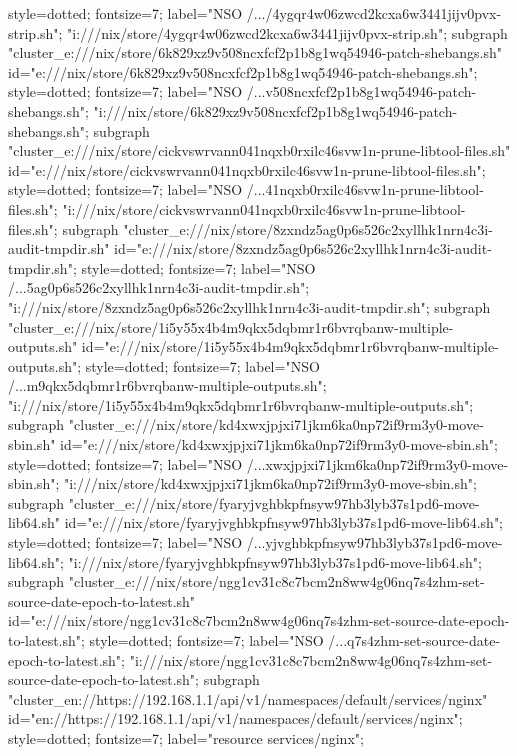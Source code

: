 {{style=dotted;
fontsize=7;
label="NSO /.../4ygqr4w06zwcd2kcxa6w3441jijv0pvx-strip.sh";
"i:///nix/store/4ygqr4w06zwcd2kcxa6w3441jijv0pvx-strip.sh";
}
subgraph "cluster_e:///nix/store/6k829xz9v508ncxfcf2p1b8g1wq54946-patch-shebangs.sh" {
id="e:///nix/store/6k829xz9v508ncxfcf2p1b8g1wq54946-patch-shebangs.sh";
style=dotted;
fontsize=7;
label="NSO /...v508ncxfcf2p1b8g1wq54946-patch-shebangs.sh";
"i:///nix/store/6k829xz9v508ncxfcf2p1b8g1wq54946-patch-shebangs.sh";
}
subgraph "cluster_e:///nix/store/cickvswrvann041nqxb0rxilc46svw1n-prune-libtool-files.sh" {
id="e:///nix/store/cickvswrvann041nqxb0rxilc46svw1n-prune-libtool-files.sh";
style=dotted;
fontsize=7;
label="NSO /...41nqxb0rxilc46svw1n-prune-libtool-files.sh";
"i:///nix/store/cickvswrvann041nqxb0rxilc46svw1n-prune-libtool-files.sh";
}
subgraph "cluster_e:///nix/store/8zxndz5ag0p6s526c2xyllhk1nrn4c3i-audit-tmpdir.sh" {
id="e:///nix/store/8zxndz5ag0p6s526c2xyllhk1nrn4c3i-audit-tmpdir.sh";
style=dotted;
fontsize=7;
label="NSO /...5ag0p6s526c2xyllhk1nrn4c3i-audit-tmpdir.sh";
"i:///nix/store/8zxndz5ag0p6s526c2xyllhk1nrn4c3i-audit-tmpdir.sh";
}
subgraph "cluster_e:///nix/store/1i5y55x4b4m9qkx5dqbmr1r6bvrqbanw-multiple-outputs.sh" {
id="e:///nix/store/1i5y55x4b4m9qkx5dqbmr1r6bvrqbanw-multiple-outputs.sh";
style=dotted;
fontsize=7;
label="NSO /...m9qkx5dqbmr1r6bvrqbanw-multiple-outputs.sh";
"i:///nix/store/1i5y55x4b4m9qkx5dqbmr1r6bvrqbanw-multiple-outputs.sh";
}
subgraph "cluster_e:///nix/store/kd4xwxjpjxi71jkm6ka0np72if9rm3y0-move-sbin.sh" {
id="e:///nix/store/kd4xwxjpjxi71jkm6ka0np72if9rm3y0-move-sbin.sh";
style=dotted;
fontsize=7;
label="NSO /...xwxjpjxi71jkm6ka0np72if9rm3y0-move-sbin.sh";
"i:///nix/store/kd4xwxjpjxi71jkm6ka0np72if9rm3y0-move-sbin.sh";
}
subgraph "cluster_e:///nix/store/fyaryjvghbkpfnsyw97hb3lyb37s1pd6-move-lib64.sh" {
id="e:///nix/store/fyaryjvghbkpfnsyw97hb3lyb37s1pd6-move-lib64.sh";
style=dotted;
fontsize=7;
label="NSO /...yjvghbkpfnsyw97hb3lyb37s1pd6-move-lib64.sh";
"i:///nix/store/fyaryjvghbkpfnsyw97hb3lyb37s1pd6-move-lib64.sh";
}
subgraph "cluster_e:///nix/store/ngg1cv31c8c7bcm2n8ww4g06nq7s4zhm-set-source-date-epoch-to-latest.sh" {
id="e:///nix/store/ngg1cv31c8c7bcm2n8ww4g06nq7s4zhm-set-source-date-epoch-to-latest.sh";
style=dotted;
fontsize=7;
label="NSO /...q7s4zhm-set-source-date-epoch-to-latest.sh";
"i:///nix/store/ngg1cv31c8c7bcm2n8ww4g06nq7s4zhm-set-source-date-epoch-to-latest.sh";
}
subgraph "cluster_en://https://192.168.1.1/api/v1/namespaces/default/services/nginx" {
id="en://https://192.168.1.1/api/v1/namespaces/default/services/nginx";
style=dotted;
fontsize=7;
label="resource services/nginx";
}}
